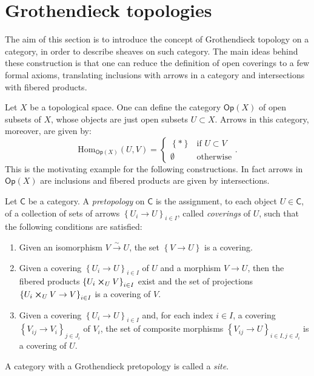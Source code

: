 \documentclass[../Main]{subfiles}
\begin{document}
\section{Grothendieck topologies}
The aim of this section is to introduce
the concept of Grothendieck topology on a category,
in order to describe sheaves on such category.
The main ideas behind these construction is that one can reduce
the definition of open coverings to a few formal axioms, translating
inclusions with arrows in a category and
intersections with fibered products.


\begin{rem}
	Let $X$ be a topological space. 
	One can define the category $\mathsf{Op}(X)$ of open subsets of $X$, whose
	objects are just open subsets $U \subset X$.
	Arrows in this category, moreover, are given by:
	\begin{equation*}
	\mathrm{Hom}_{\mathsf{Op}(X)} \left( U, V \right) =
	\begin{cases}
		\left\{ * \right\} & \text{if } U \subset V\\
		\emptyset & \text{otherwise}
	\end{cases} 
	.\end{equation*}
	This is the motivating example for the following constructions.
	In fact arrows in $\mathsf{Op}(X)$ are inclusions and
	fibered products are given by intersections.
\end{rem}


\begin{defn}[Sites]
	Let $\mathsf{C}$ be a category. 
	A {\em pretopology} on $\mathsf{C}$ is the assignment, to each object $U \in \mathsf{C}$,
	of a collection of sets of arrows $\left\{ U_{ i } \to U \right\}_{ i \in I }$,
	called {\em coverings} of $U$, such that the following conditions are satisfied:
	\begin{enumerate}
		\item Given an isomorphism $V \xrightarrow{\sim} U$, the set $\left\{ V \to U \right\}$
			is a covering.
		\item Given a covering $\left\{ U_{ i } \to U \right\}_{ i \in I }$
			of $U$ and a morphism $V \to U$, then the fibered products
			$\left\{ U_i \cross_{ U } V \right\}_{i \in I}$ exist
			and the set of projections
			$\left\{ U_i \cross_{ U } V \to V \right\}_{ i \in I }$
			is a covering of $V$.
		\item Given a covering $\left\{ U_{ i } \to U \right\}_{ i \in I }$
			and, for each index $i \in I$, a covering 
			$\left\{ V_{ ij } \to V_i \right\}_{ j \in J_i }$ of $V_i$,
			the set of composite morphisms
			$\left\{ V_{ ij } \to U \right\}_{ i \in I, j \in J_i }$
			is a covering of $U$.
	\end{enumerate}
	A category with a Grothendieck pretopology is called a {\em site}.
\end{defn}
\end{document}
